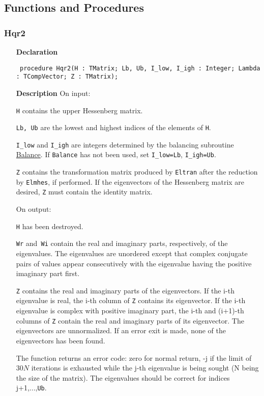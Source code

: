 \documentclass[12pt,a4paper,oneside]{report}
\newcommand{\declarationitem}[1]{\textbf{#1}}
\newcommand{\descriptiontitle}[1]{\textbf{#1}}
\newcommand{\code}[1]{\texttt{#1}}
\begin{document}
\subsection{Functions and Procedures}
\subsubsection{Hqr2}
\label{uhqr2-Hqr2}
\begin{itemize}\item[\declarationitem{Declaration}\hfill]
	\begin{flushleft}
		\code{
			procedure Hqr2(H : TMatrix; Lb, Ub, I{\_}low, I{\_}igh : Integer; Lambda : TCompVector; Z : TMatrix);}
		
	\end{flushleft}
	
	\par
	\item[\descriptiontitle{Description}]
	On input:
	
	\code{H} contains the upper Hessenberg matrix.
	
	\code{Lb, Ub} are the lowest and highest indices of the elements of \code{H}.
	
	\code{I{\_}low} and \code{I{\_}igh} are integers determined by the balancing subroutine \hyperref[ubalance]{Balance}. If \code{Balance} has not been used, set \code{I{\_}low=Lb}, \code{I{\_}igh=Ub}.
	
	\code{Z} contains the transformation matrix produced by \code{Eltran} after the reduction by \code{Elmhes}, if performed. If the eigenvectors of the Hessenberg matrix are desired, \code{Z} must contain the identity matrix.
	
	On output:
	
	\code{H} has been destroyed.
	
	\code{Wr} and\code{ Wi} contain the real and imaginary parts, respectively, of the eigenvalues. The eigenvalues are unordered except that complex conjugate pairs of values appear consecutively with the eigenvalue having the positive imaginary part first.
	
	\code{Z} contains the real and imaginary parts of the eigenvectors. If the i{-}th eigenvalue is real, the i{-}th column of \code{Z} contains its eigenvector. If the i{-}th eigenvalue is complex with positive imaginary part, the i{-}th and (i+1){-}th columns of \code{Z} contain the real and imaginary parts of its eigenvector. The eigenvectors are unnormalized. If an error exit is made, none of the eigenvectors has been found.
	
	The function returns an error code: zero for normal return, {-}j if the limit of $30N$ iterations is exhausted while the j{-}th eigenvalue is being sought (N being the size of the matrix). The eigenvalues should be correct for indices j+1,...,\code{Ub}.
	
\end{itemize}
\end{document}
